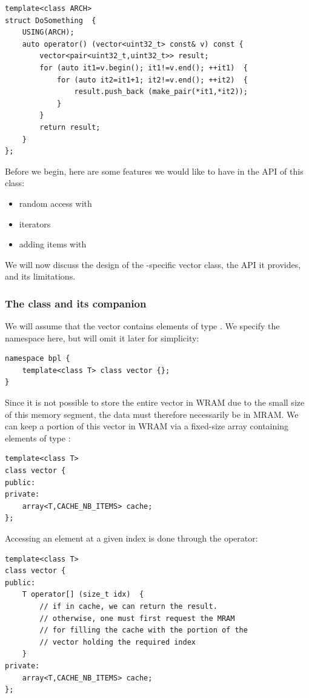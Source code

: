 \begin{verbatim}
template<class ARCH>
struct DoSomething  {
    USING(ARCH);
    auto operator() (vector<uint32_t> const& v) const {
        vector<pair<uint32_t,uint32_t>> result;
        for (auto it1=v.begin(); it1!=v.end(); ++it1)  {
            for (auto it2=it1+1; it2!=v.end(); ++it2)  {
                result.push_back (make_pair(*it1,*it2));
            }
        }
        return result;
    }
};
\end{verbatim}

Before we begin, here are some features we would like to have in the API of this  class:
\begin{itemize}
	\item random access with  
	\item iterators
	\item adding items with  
\end{itemize}

We will now discuss the design of the \BPL-specific vector class, the API it provides, and its limitations.
  
\subsubsection{The  class and its companion }

We will assume that the vector contains elements of type . 
We specify the  namespace here, but will omit it later for simplicity:

\begin{verbatim}
namespace bpl {
    template<class T> class vector {};
}
\end{verbatim}

Since it is not possible to store the entire vector in WRAM due to the small size of this memory segment, the data must therefore necessarily be in MRAM. 
We can keep a portion of this vector in WRAM via a fixed-size array containing  elements of type :

\begin{verbatim}
template<class T> 
class vector {
public:
private:
    array<T,CACHE_NB_ITEMS> cache;	
};
\end{verbatim}

Accessing an element at a given index is done through the  operator:

\begin{verbatim}
template<class T> 
class vector {
public:
    T operator[] (size_t idx)  { 
        // if in cache, we can return the result.
        // otherwise, one must first request the MRAM 
        // for filling the cache with the portion of the
        // vector holding the required index
	}
private:
    array<T,CACHE_NB_ITEMS> cache;	
};
\end{verbatim}

